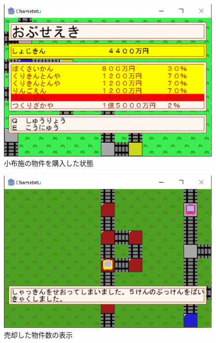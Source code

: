 \documentclass[a4j]{jarticle}
\begin{document}
    \begin{figure}[H]
        \centering
        \includegraphics[scale=1.3]{obuse.eps}
        \caption{小布施の物件を購入した状態}
         \label{obuse}
        \end{figure}

    \begin{figure}[H]
        \centering
        \includegraphics[scale=1.3]{b5.eps}
        \caption{売却した物件数の表示}
         \label{b5}
        \end{figure}
\end{document}
